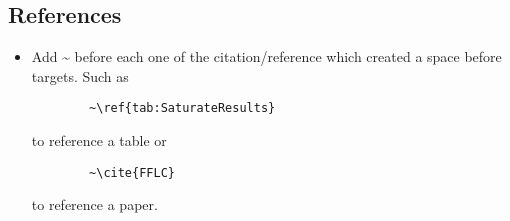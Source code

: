 \documentclass[acmsmall,screen,review]{acmart}
\begin{document}
\subsection{References}
\begin{itemize}
    \item Add \textasciitilde{ } before each one of the citation/reference which created a space before targets. Such as
    \begin{verbatim}
        ~\ref{tab:SaturateResults}
    \end{verbatim}
    \vspace{-\baselineskip}
    to reference a table or
    \begin{verbatim}
        ~\cite{FFLC}
    \end{verbatim}
    \vspace{-\baselineskip}
    to reference a paper.
    
\end{itemize}
\end{document}
